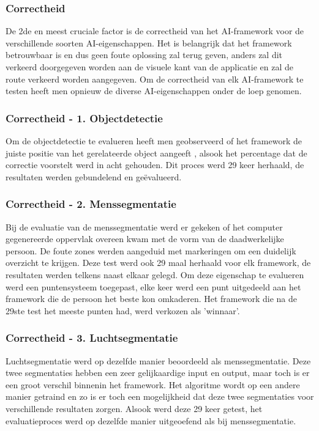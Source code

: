 \subsubsection{Correctheid}
De 2de en meest cruciale factor is de correctheid van het AI-framework voor de verschillende soorten AI-eigenschappen. Het is belangrijk dat het framework betrouwbaar is en dus geen foute oplossing zal terug geven, anders zal dit verkeerd doorgegeven worden aan de visuele kant van de applicatie en zal de route verkeerd worden aangegeven. Om de correctheid van elk AI-framework te testen heeft men opnieuw de diverse AI-eigenschappen onder de loep genomen.

\subsubsection{Correctheid - 1.  Objectdetectie}
Om de objectdetectie te evalueren heeft men geobserveerd of het framework de juiste positie van het gerelateerde object aangeeft , alsook het percentage dat de correctie voorstelt werd in acht gehouden. Dit proces werd 29 keer herhaald, de resultaten werden gebundelend en geëvalueerd. 

\subsubsection{Correctheid - 2. Menssegmentatie}
Bij de evaluatie van de menssegmentatie werd er gekeken of het computer gegenereerde oppervlak overeen kwam met de vorm van de daadwerkelijke persoon. De foute zones werden aangeduid met markeringen om een duidelijk overzicht te krijgen. Deze test werd ook 29 maal herhaald voor elk framework, de resultaten werden telkens naast elkaar gelegd. Om deze eigenschap te evalueren werd een puntensysteem toegepast, elke keer werd een punt uitgedeeld aan het framework die de persoon het beste kon omkaderen. Het framework die na de 29ste test het meeste punten had, werd verkozen als 'winnaar'.

\subsubsection{Correctheid - 3. Luchtsegmentatie}
Luchtsegmentatie werd op dezelfde manier beoordeeld als menssegmentatie. Deze twee segmentaties hebben een zeer gelijkaardige input en output, maar toch is er een groot verschil binnenin het framework. Het algoritme wordt op een andere manier getraind en zo is er toch een mogelijkheid dat deze twee segmentaties voor verschillende resultaten zorgen. Alsook werd deze 29 keer getest, het evaluatieproces werd op dezelfde manier uitgeoefend als bij menssegmentatie.

